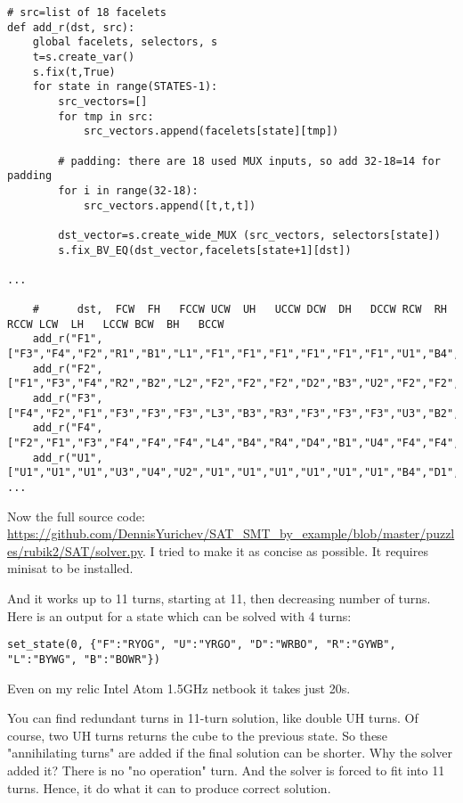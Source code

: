 \begin{lstlisting}[style=custompy]
# src=list of 18 facelets
def add_r(dst, src):
    global facelets, selectors, s
    t=s.create_var()
    s.fix(t,True)
    for state in range(STATES-1):
        src_vectors=[]
        for tmp in src:
            src_vectors.append(facelets[state][tmp])

        # padding: there are 18 used MUX inputs, so add 32-18=14 for padding
        for i in range(32-18): 
            src_vectors.append([t,t,t])

        dst_vector=s.create_wide_MUX (src_vectors, selectors[state])
        s.fix_BV_EQ(dst_vector,facelets[state+1][dst])

...

    #      dst,  FCW  FH   FCCW UCW  UH   UCCW DCW  DH   DCCW RCW  RH   RCCW LCW  LH   LCCW BCW  BH   BCCW
    add_r("F1",["F3","F4","F2","R1","B1","L1","F1","F1","F1","F1","F1","F1","U1","B4","D1","F1","F1","F1"])
    add_r("F2",["F1","F3","F4","R2","B2","L2","F2","F2","F2","D2","B3","U2","F2","F2","F2","F2","F2","F2"])
    add_r("F3",["F4","F2","F1","F3","F3","F3","L3","B3","R3","F3","F3","F3","U3","B2","D3","F3","F3","F3"])
    add_r("F4",["F2","F1","F3","F4","F4","F4","L4","B4","R4","D4","B1","U4","F4","F4","F4","F4","F4","F4"])
    add_r("U1",["U1","U1","U1","U3","U4","U2","U1","U1","U1","U1","U1","U1","B4","D1","F1","R2","D4","L3"])
...
\end{lstlisting}

Now the full source code: \url{https://github.com/DennisYurichev/SAT_SMT_by_example/blob/master/puzzles/rubik2/SAT/solver.py}.
I tried to make it as concise as possible.
It requires minisat to be installed.

And it works up to 11 turns, starting at 11, then decreasing number of turns.
Here is an output for a state which can be solved with 4 turns:

\begin{lstlisting}
set_state(0, {"F":"RYOG", "U":"YRGO", "D":"WRBO", "R":"GYWB", "L":"BYWG", "B":"BOWR"})
\end{lstlisting}



Even on my relic Intel Atom 1.5GHz netbook it takes just 20s.

You can find redundant turns in 11-turn solution, like double UH turns.
Of course, two UH turns returns the cube to the previous state.
So these "annihilating turns" are added if the final solution can be shorter.
Why the solver added it? There is no "no operation" turn. And the solver is forced to fit into 11 turns.
Hence, it do what it can to produce correct solution.

